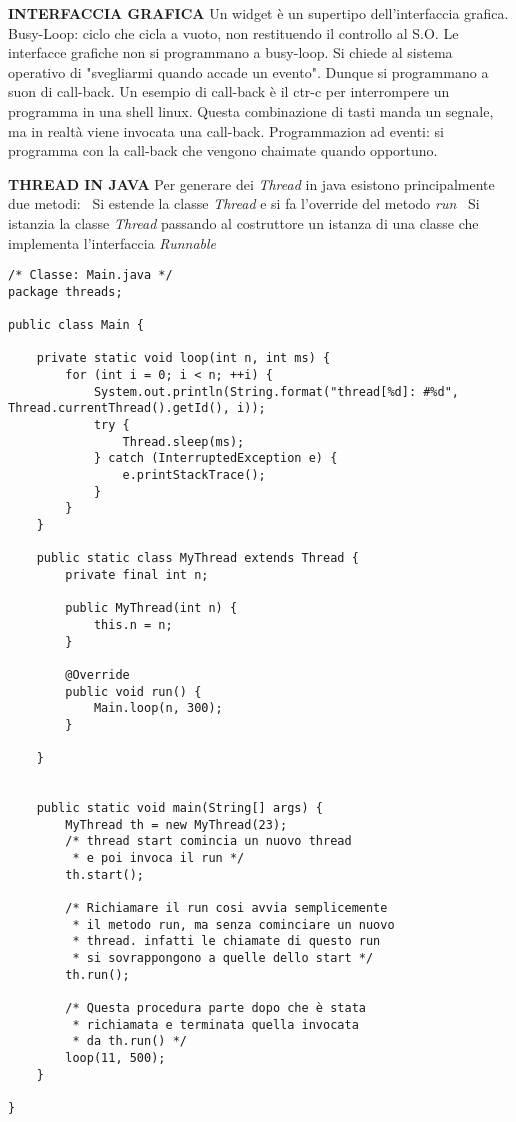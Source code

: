 \noindent \textbf{INTERFACCIA GRAFICA} \newline
Un widget è un supertipo dell'interfaccia grafica. \newline
Busy-Loop: ciclo che cicla a vuoto, non restituendo il controllo al S.O. \newline
Le interfacce grafiche non si programmano a busy-loop. Si chiede al sistema operativo di "svegliarmi quando accade un evento". Dunque si programmano a suon di call-back. \newline
Un esempio di call-back è il ctr-c per interrompere un programma in una shell linux. Questa combinazione di tasti manda un segnale, ma in realtà viene invocata una call-back. \newline
Programmazion ad eventi: si programma con la call-back che vengono chaimate quando opportuno.

\noindent \textbf{THREAD IN JAVA} \newline
Per generare dei \textit{Thread} in java esistono principalmente due metodi: \newline
\textbullet\ Si estende la classe \textit{Thread} e si fa l'override del metodo \textit{run} \newline
\textbullet\ Si istanzia la classe \textit{Thread} passando al costruttore un istanza di una classe che implementa l'interfaccia \textit{Runnable}



\begin{lstlisting}
/* Classe: Main.java */
package threads;

public class Main {

    private static void loop(int n, int ms) {
        for (int i = 0; i < n; ++i) {
            System.out.println(String.format("thread[%d]: #%d", Thread.currentThread().getId(), i));
            try {
                Thread.sleep(ms);
            } catch (InterruptedException e) {
                e.printStackTrace();
            }
        }
    }

    public static class MyThread extends Thread {
        private final int n;

        public MyThread(int n) {
            this.n = n;
        }

        @Override
        public void run() {
            Main.loop(n, 300);
        }

    }


    public static void main(String[] args) {
        MyThread th = new MyThread(23);
        /* thread start comincia un nuovo thread
         * e poi invoca il run */
        th.start();
        
        /* Richiamare il run cosi avvia semplicemente 
         * il metodo run, ma senza cominciare un nuovo 
         * thread. infatti le chiamate di questo run
         * si sovrappongono a quelle dello start */
        th.run();
        
        /* Questa procedura parte dopo che è stata 
         * richiamata e terminata quella invocata
         * da th.run() */
        loop(11, 500);
    }

}
\end{lstlisting}

